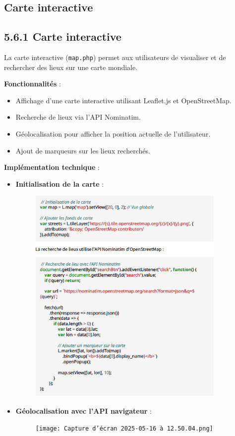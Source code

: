 \documentclass[a4paper,12pt]{article}
\begin{document}
\subsection{Carte interactive}
\subsection*{5.6.1 Carte interactive}

La carte interactive (\texttt{map.php}) permet aux utilisateurs de visualiser et de rechercher des lieux sur une carte mondiale.

\textbf{Fonctionnalités} :
\begin{itemize}
  \item Affichage d'une carte interactive utilisant Leaflet.js et OpenStreetMap.
  \item Recherche de lieux via l'API Nominatim.
  \item Géolocalisation pour afficher la position actuelle de l'utilisateur.
  \item Ajout de marqueurs sur les lieux recherchés.
\end{itemize}

\textbf{Implémentation technique} :
\begin{itemize}
  \item \textbf{Initialisation de la carte} :
  \begin{figure}[H]
  \centering
  \includegraphics[width=0.9\textwidth]{1.png}

\end{figure}

  \item \textbf{Géolocalisation avec l'API navigateur} :
  \begin{figure}[H]
  \centering
  \texttt{[image: Capture d’écran 2025-05-16 à 12.50.04.png]}

\end{figure}
\end{itemize}
\end{document}
